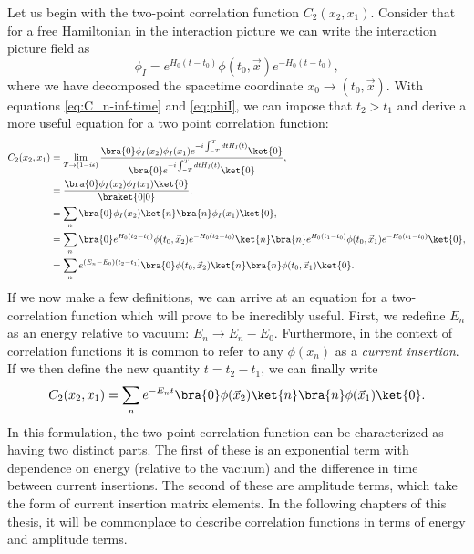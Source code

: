 Let us begin with the two-point correlation function $C_2(x_2,x_1)$. Consider that for a free Hamiltonian in the interaction picture we can write the interaction picture field as
\begin{equation}\label{eq:phiI}
    \phi_I = e^{H_0(t-t_0)}\phi(t_0,\vec{x})e^{-H_0(t-t_0)},
\end{equation}
where we have decomposed the spacetime coordinate $x_0\rightarrow (t_0,\vec{x})$.  With equations \ref{eq:C_n-inf-time} and \ref{eq:phiI}, we can impose that $t_2>t_1$ and derive a more useful equation for a two point correlation function:
\begin{equation}\label{eq_C2_derivation}
    \begin{split}
        C_2(x_2,x_1) &=\lim_{T\rightarrow(1-i\epsilon)} \frac{\bra{0}\phi_I(x_2)\phi_I(x_1)e^{-i\int^T_{-T}dtH_I(t)}\ket{0}}{\bra{0}e^{-i\int^T_{-T}dtH_I(t)}\ket{0}},\\
        &= \frac{\bra{0}\phi_I(x_2)\phi_I(x_1)\ket{0}}{\braket{0|0}},\\
        &=\sum_n \bra{0}\phi_I(x_2)\ket{n} \bra{n}\phi_I(x_1)\ket{0},\\
        &=\sum_n \bra{0}e^{H_0(t_2-t_0)}\phi(t_0,\vec{x}_2)e^{-H_0(t_2-t_0)}\ket{n}
        \bra{n}e^{H_0(t_1-t_0)}\phi(t_0,\vec{x}_1)e^{-H_0(t_1-t_0)}\ket{0},\\
        &=\sum_n e^{(E_n-E_0)(t_2-t_1)}\bra{0}\phi(t_0,\vec{x}_2)\ket{n}\bra{n}\phi(t_0,\vec{x}_1)\ket{0}.
    \end{split}
\end{equation}
If we now make a few definitions, we can arrive at an equation for a two-correlation function which will prove to be incredibly useful.  First, we redefine $E_n$ as an energy relative to vacuum: $E_n\rightarrow E_n - E_0$.  Furthermore, in the context of correlation functions it is common to refer to any $\phi(x_n)$ as a \textit{current insertion}.  If we then define the new quantity $t=t_2-t_1$, we can finally write
\begin{equation}\label{eq:_C2_final}
    C_2(x_2,x_1) = \sum_n e^{-E_nt}\bra{0}\phi(\vec{x}_2)\ket{n}\bra{n}\phi(\vec{x}_1)\ket{0}.
\end{equation}
In this formulation, the two-point correlation function can be characterized as having two distinct parts.  The first of these is an exponential term with dependence on energy (relative to the vacuum) and the difference in time between current insertions.  The second of these are amplitude terms, which take the form of current insertion matrix elements.  In the following chapters of this thesis, it will be commonplace to describe correlation functions in terms of energy and amplitude terms.


